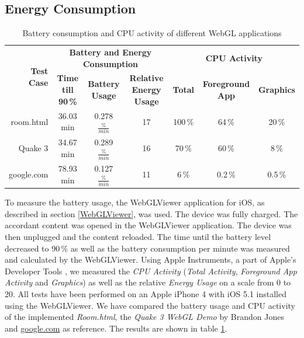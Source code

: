\documentclass[12pt,journal,compsoc]{IEEEtran}
\begin{document}
\subsection{Energy Consumption}

\begin{table}[tb]
	\begin{centering}
	\begin{tabular}{r|c|c|c|c|c|c}
		\multirow{2}{*}{\textbf{Test Case}} & \multicolumn{3}{c|}{\textbf{Battery and Energy Consumption}}						 & \multicolumn{3}{c}{\textbf{CPU Activity}}					\\
 							&\textbf{Time till 90\,\%} & \textbf{Battery Usage}	& \textbf{Relative Energy Usage} & \textbf{Total} 	& \textbf{Foreground App} 		& \textbf{Graphics}	\\
		\hline
		room.html		   &	36.03 min				& 0.278 $\frac{\%}{min}$	&	17							& 100\,\%			& 64\,\%						& 20\,\%			\\
		Quake 3			   &	34.67 min				& 0.289 $\frac{\%}{min}$	&	16							& 70\,\%			& 60\,\%						& 8\,\%			\\
		google.com		   &	78.93 min				& 0.127	$\frac{\%}{min}$	&	11							& 6\,\%				& 0.2\,\%						& 0.5\,\%		\\
	\end{tabular}
	\caption{Battery consumption and CPU activity of different WebGL applications\label{batteryTable}}
	\end{centering}
\end{table}

To measure the battery usage, the WebGLViewer application for iOS, as described in section \ref{WebGLViewer}, was used. The device was fully charged. The accordant content was opened in the WebGLViewer application. The device was then unplugged and the content reloaded. The time until the battery level decreased to 90\,\% as well as the battery consumption per minute was measured and calculated by the WebGLViewer. Using Apple Instruments, a part of Apple’s Developer Tools \cite{AppleDevTools}, we measured the \textit{CPU Activity} (\textit{Total Activity}, \textit{Foreground App Activity} and \textit{Graphics}) as well as the relative \textit{Energy Usage} on a scale from 0 to 20. All tests have been performed on an Apple iPhone 4 with iOS 5.1 installed using the WebGLViewer. We have compared the battery usage and CPU activity of the implemented \textit{Room.html}, the \textit{Quake 3 WebGL Demo} by Brandon Jones \cite{quakewebgl} and \url{google.com} as reference. The results are shown in table \ref{batteryTable}.
\end{document}
